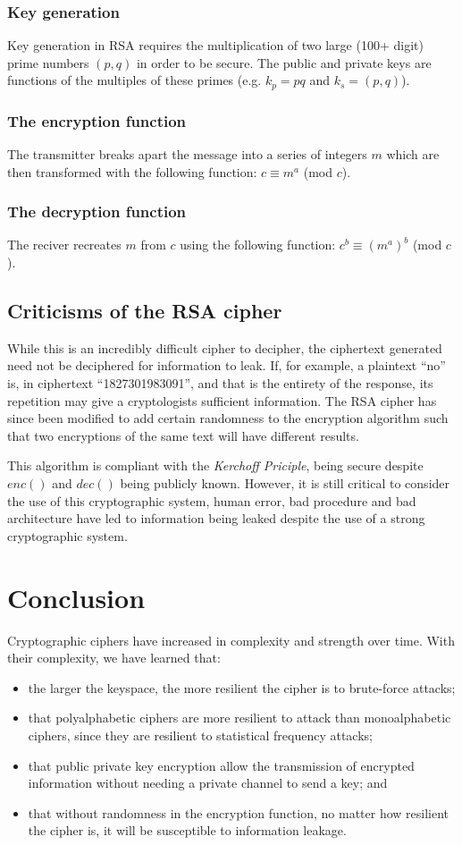 \documentclass{AIAA}
\begin{document}
\subsubsection{Key generation}
Key generation in RSA requires the multiplication of two large (100+ digit) prime numbers $(p,q)$ in order to be secure. The public and private keys are functions of the multiples of these primes (e.g. $k_{p}=pq$ and $k_s=(p,q)$).
\subsubsection{The encryption function}
The transmitter breaks apart the message into a series of integers $m$ which are then transformed with the following function:
$c \equiv m^{a} $ (mod $c$).
\subsubsection{The decryption function}
The reciver recreates $m$ from $c$ using the following function:
$c^{b} \equiv (m^{a})^{b} $ (mod $c$). 

\subsection{Criticisms of the RSA cipher}
While this is an incredibly difficult cipher to decipher, the ciphertext generated need not be deciphered for information to leak. If, for example, a plaintext ``no'' is, in ciphertext ``1827301983091'', and that is the entirety of the response, its repetition may give a cryptologists sufficient information. The RSA cipher has since been modified to add certain randomness to the encryption algorithm such that two encryptions of the same text will have different results.

This algorithm is compliant with the \textit{Kerchoff Priciple}, being secure despite $enc()$ and $dec()$ being publicly known. However, it is still critical to consider the use of this cryptographic system, human error, bad procedure and bad architecture have led to information being leaked despite the use of a strong cryptographic system.

\section{Conclusion}
Cryptographic ciphers have increased in complexity and strength over time. With their complexity, we have learned that:
\begin{itemize}
\item the larger the keyspace, the more resilient the cipher is to brute-force attacks;
\item that polyalphabetic ciphers are more resilient to attack than monoalphabetic ciphers, since they are resilient to statistical frequency attacks;
\item that public private key encryption allow the transmission of encrypted information without needing a private channel to send a key; and
\item that without randomness in the encryption function, no matter how resilient the cipher is, it will be susceptible to information leakage.
\end{itemize}
\end{document}
